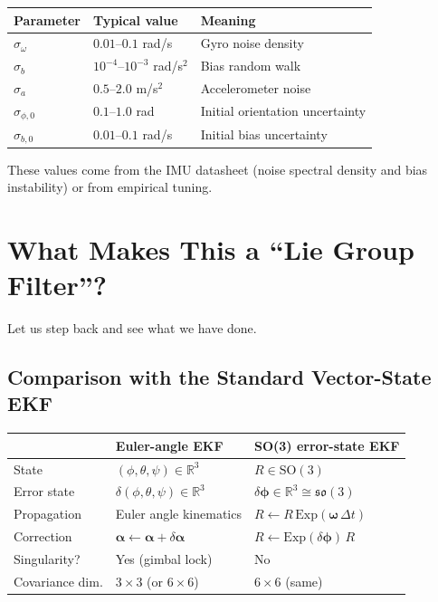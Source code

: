 \documentclass[11pt,letterpaper]{article}
\newcommand{\R}{\mathbb{R}}
\newcommand{\SO}{\mathrm{SO}(3)}
\newcommand{\so}{\mathfrak{so}(3)}
\newcommand{\expmap}{\mathrm{Exp}}
\begin{document}
\begin{center}
\begin{tabular}{lll}
\toprule
\textbf{Parameter} & \textbf{Typical value} & \textbf{Meaning} \\
\midrule
$\sigma_{\omega}$ & $0.01$--$0.1$ rad/s & Gyro noise density \\
$\sigma_{b}$ & $10^{-4}$--$10^{-3}$ rad/s$^{2}$ & Bias random walk \\
$\sigma_{a}$ & $0.5$--$2.0$ m/s$^{2}$ & Accelerometer noise \\
$\sigma_{\phi,0}$ & $0.1$--$1.0$ rad & Initial orientation uncertainty \\
$\sigma_{b,0}$ & $0.01$--$0.1$ rad/s & Initial bias uncertainty \\
\bottomrule
\end{tabular}
\end{center}

These values come from the IMU datasheet (noise spectral density
and bias instability) or from empirical tuning.

\newpage
\section{What Makes This a ``Lie Group Filter''?}

Let us step back and see what we have done.

\subsection{Comparison with the Standard Vector-State EKF}

\begin{center}
\begin{tabular}{lll}
\toprule
& \textbf{Euler-angle EKF} & \textbf{SO(3) error-state EKF} \\
\midrule
State & $(\phi, \theta, \psi) \in \R^{3}$
  & $R \in \SO$ \\
Error state & $\delta(\phi, \theta, \psi) \in \R^{3}$
  & $\delta\bm{\phi} \in \R^{3} \cong \so$ \\
Propagation & Euler angle kinematics & $R \leftarrow R\,\expmap(\bm{\omega}\,\Delta t)$ \\
Correction & $\bm{\alpha} \leftarrow \bm{\alpha} + \delta\bm{\alpha}$
  & $R \leftarrow \expmap(\delta\bm{\phi})\,R$ \\
Singularity? & Yes (gimbal lock) & No \\
Covariance dim. & $3 \times 3$ (or $6 \times 6$)
  & $6 \times 6$ (same) \\
\bottomrule
\end{tabular}
\end{center}
\end{document}
